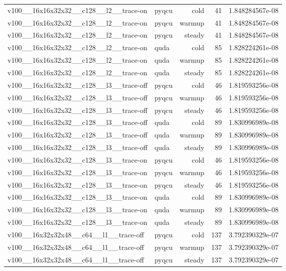 \begin{table}[htbp]
\begin{tabular}{@{}llrrr@{}}
v100\_\_16x16x32x32\_\_c128\_\_l2\_\_trace-on & pyqcu & cold & 41 & 1.848284567e-08 \\
v100\_\_16x16x32x32\_\_c128\_\_l2\_\_trace-on & pyqcu & warmup & 41 & 1.848284567e-08 \\
v100\_\_16x16x32x32\_\_c128\_\_l2\_\_trace-on & pyqcu & steady & 41 & 1.848284567e-08 \\
v100\_\_16x16x32x32\_\_c128\_\_l2\_\_trace-on & quda & cold & 85 & 1.828224261e-08 \\
v100\_\_16x16x32x32\_\_c128\_\_l2\_\_trace-on & quda & warmup & 85 & 1.828224261e-08 \\
v100\_\_16x16x32x32\_\_c128\_\_l2\_\_trace-on & quda & steady & 85 & 1.828224261e-08 \\
v100\_\_16x16x32x32\_\_c128\_\_l3\_\_trace-off & pyqcu & cold & 46 & 1.819593256e-08 \\
v100\_\_16x16x32x32\_\_c128\_\_l3\_\_trace-off & pyqcu & warmup & 46 & 1.819593256e-08 \\
v100\_\_16x16x32x32\_\_c128\_\_l3\_\_trace-off & pyqcu & steady & 46 & 1.819593256e-08 \\
v100\_\_16x16x32x32\_\_c128\_\_l3\_\_trace-off & quda & cold & 89 & 1.830996989e-08 \\
v100\_\_16x16x32x32\_\_c128\_\_l3\_\_trace-off & quda & warmup & 89 & 1.830996989e-08 \\
v100\_\_16x16x32x32\_\_c128\_\_l3\_\_trace-off & quda & steady & 89 & 1.830996989e-08 \\
v100\_\_16x16x32x32\_\_c128\_\_l3\_\_trace-on & pyqcu & cold & 46 & 1.819593256e-08 \\
v100\_\_16x16x32x32\_\_c128\_\_l3\_\_trace-on & pyqcu & warmup & 46 & 1.819593256e-08 \\
v100\_\_16x16x32x32\_\_c128\_\_l3\_\_trace-on & pyqcu & steady & 46 & 1.819593256e-08 \\
v100\_\_16x16x32x32\_\_c128\_\_l3\_\_trace-on & quda & cold & 89 & 1.830996989e-08 \\
v100\_\_16x16x32x32\_\_c128\_\_l3\_\_trace-on & quda & warmup & 89 & 1.830996989e-08 \\
v100\_\_16x16x32x32\_\_c128\_\_l3\_\_trace-on & quda & steady & 89 & 1.830996989e-08 \\
v100\_\_16x32x32x48\_\_c64\_\_l1\_\_trace-off & pyqcu & cold & 137 & 3.792390329e-07 \\
v100\_\_16x32x32x48\_\_c64\_\_l1\_\_trace-off & pyqcu & warmup & 137 & 3.792390329e-07 \\
v100\_\_16x32x32x48\_\_c64\_\_l1\_\_trace-off & pyqcu & steady & 137 & 3.792390329e-07 \\

\end{tabular}
\end{table}
